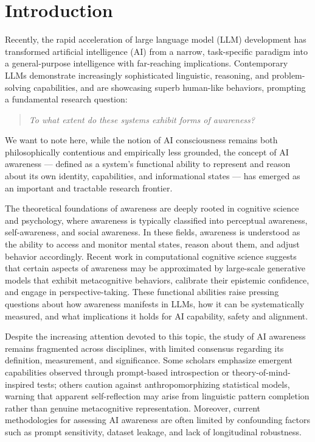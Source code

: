 \section{Introduction}
\label{sec:intro}

Recently, the rapid acceleration of large language model (LLM) development has transformed artificial intelligence (AI) from a narrow, task-specific paradigm into a general-purpose intelligence with far-reaching implications. Contemporary LLMs demonstrate increasingly sophisticated linguistic, reasoning, and problem-solving capabilities, and are showcasing superb human-like behaviors, prompting a fundamental research question: 

\begin{quote}
\begin{center}
\emph{To what extent do these systems exhibit forms of awareness?}
\end{center}
\end{quote}

We want to note here, while the notion of AI consciousness remains both philosophically contentious and empirically less grounded, the concept of AI awareness --- defined as a system’s functional ability to represent and reason about its own identity, capabilities, and informational states --- has emerged as an important and tractable research frontier.

The theoretical foundations of awareness are deeply rooted in cognitive science and psychology, where awareness is typically classified into perceptual awareness, self-awareness, and social awareness. In these fields, awareness is understood as the ability to access and monitor mental states, reason about them, and adjust behavior accordingly. Recent work in computational cognitive science suggests that certain aspects of awareness may be approximated by large-scale generative models that exhibit metacognitive behaviors, calibrate their epistemic confidence, and engage in perspective-taking. These functional abilities raise pressing questions about how awareness manifests in LLMs, how it can be systematically measured, and what implications it holds for AI capability, safety and alignment.

Despite the increasing attention devoted to this topic, the study of AI awareness remains fragmented across disciplines, with limited consensus regarding its definition, measurement, and significance. Some scholars emphasize emergent capabilities observed through prompt-based introspection or theory-of-mind-inspired tests; others caution against anthropomorphizing statistical models, warning that apparent self-reflection may arise from linguistic pattern completion rather than genuine metacognitive representation. Moreover, current methodologies for assessing AI awareness are often limited by confounding factors such as prompt sensitivity, dataset leakage, and lack of longitudinal robustness.


